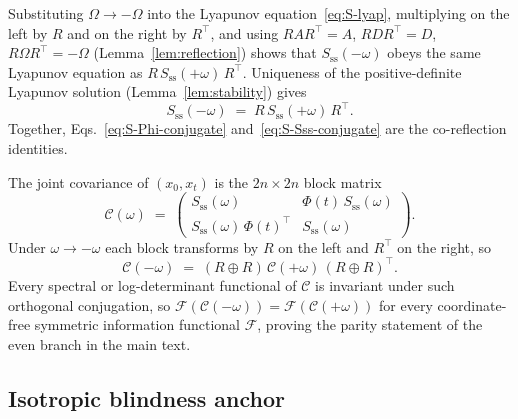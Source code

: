 \documentclass[%
 reprint,
 superscriptaddress,
 nofootinbib,
 nobibnotes,
 amsmath,amssymb,
 aps,
 prl,
 floatfix,
]{revtex4-2}
\newcommand{\Sss}{S_{\mathrm{ss}}}
\begin{document}
Substituting $\Omega \to -\Omega$ into the Lyapunov equation~\eqref{eq:S-lyap}, multiplying on the left by $R$ and on the right by $R^\top$, and using $R A R^\top = A$, $R D R^\top = D$, $R \Omega R^\top = -\Omega$ (Lemma~\ref{lem:reflection}) shows that $\Sss(-\omega)$ obeys the same Lyapunov equation as $R\,\Sss(+\omega)\,R^\top$. Uniqueness of the positive-definite Lyapunov solution (Lemma~\ref{lem:stability}) gives
\begin{equation}\label{eq:S-Sss-conjugate}
\Sss(-\omega) \;=\; R\,\Sss(+\omega)\,R^\top.
\end{equation}
Together, Eqs.~\eqref{eq:S-Phi-conjugate} and~\eqref{eq:S-Sss-conjugate} are the co-reflection identities.

The joint covariance of $(x_0, x_t)$ is the $2n \times 2n$ block matrix
\[
\mathcal C(\omega) \;=\; \begin{pmatrix} \Sss(\omega) & \Phi(t)\,\Sss(\omega) \\ \Sss(\omega)\,\Phi(t)^\top & \Sss(\omega) \end{pmatrix}.
\]
Under $\omega \to -\omega$ each block transforms by $R$ on the left and $R^\top$ on the right, so
\begin{equation}\label{eq:S-jointcov-transform}
\mathcal C(-\omega) \;=\; (R \oplus R)\,\mathcal C(+\omega)\,(R \oplus R)^\top.
\end{equation}
Every spectral or log-determinant functional of $\mathcal C$ is invariant under such orthogonal conjugation, so $\mathcal F(\mathcal C(-\omega)) = \mathcal F(\mathcal C(+\omega))$ for every coordinate-free symmetric information functional $\mathcal F$, proving the parity statement of the even branch in the main text.

\subsection{Isotropic blindness anchor}\label{app:isotropy-anchor}
\end{document}

